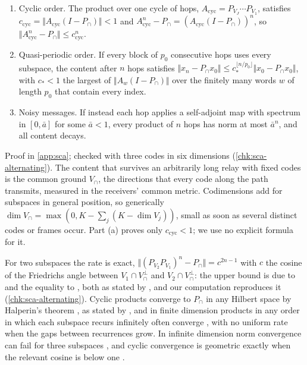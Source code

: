 \begin{theorem}\label{thm:sca-alternating}
\begin{enumerate}
\item[(a)] Cyclic order. The product over one cycle of hops, $A_{\mathrm{cyc}}=P_{V_J}\cdots P_{V_1}$, satisfies $c_{\mathrm{cyc}}=\Vert A_{\mathrm{cyc}}(I-P_\cap)\Vert<1$ and $A_{\mathrm{cyc}}^n-P_\cap=(A_{\mathrm{cyc}}(I-P_\cap))^n$, so $\Vert A_{\mathrm{cyc}}^n-P_\cap\Vert\le c_{\mathrm{cyc}}^n$.
\item[(b)] Quasi-periodic order. If every block of $p_0$ consecutive hops uses every subspace, the content after $n$ hops satisfies $\Vert x_n-P_\cap x_0\Vert\le c_\ast^{\lfloor n/p_0\rfloor}\Vert x_0-P_\cap x_0\Vert$, with $c_\ast<1$ the largest of $\Vert A_w(I-P_\cap)\Vert$ over the finitely many words $w$ of length $p_0$ that contain every index.
\item[(c)] Noisy messages. If instead each hop applies a self-adjoint map with spectrum in $[0,\bar a]$ for some $\bar a<1$, every product of $n$ hops has norm at most $\bar a^n$, and all content decays.
\end{enumerate}
\end{theorem}
Proof in \cref{app:sca}; checked with three codes in six dimensions (\cref{chk:sca-alternating}). The content that survives an arbitrarily long relay with fixed codes is the common ground $V_\cap$, the directions that every code along the path transmits, measured in the receivers' common metric. Codimensions add for subspaces in general position, so generically $\dim V_\cap=\max(0,K-\sum_j(K-\dim V_j))$, small as soon as several distinct codes or frames occur. Part (a) proves only $c_{\mathrm{cyc}}<1$; we use no explicit formula for it.

\begin{remark}\label{rem:sca-alternating-cited}
For two subspaces the rate is exact, $\Vert(P_{V_2}P_{V_1})^n-P_\cap\Vert=c^{2n-1}$ with $c$ the cosine of the Friedrichs angle \citep{friedrichs1937certain} between $V_1\cap V_\cap^\perp$ and $V_2\cap V_\cap^\perp$: the upper bound is due to \citet{aronszajn1950theory} and the equality to \citet{kayalar1988error}, both as stated by \citet{badea2012rate}, and our computation reproduces it (\cref{chk:sca-alternating}). Cyclic products converge to $P_\cap$ in any Hilbert space by Halperin's theorem \citep{halperin1962product}, as stated by \citet{badea2012rate}, and in finite dimension products in any order in which each subspace recurs infinitely often converge \citep{amemiya1965convergence,prager1960convergence}, with no uniform rate when the gaps between recurrences grow. In infinite dimension norm convergence can fail for three subspaces \citep{kopecka2017strange}, and cyclic convergence is geometric exactly when the relevant cosine is below one \citep{badea2012rate}.
\end{remark}

